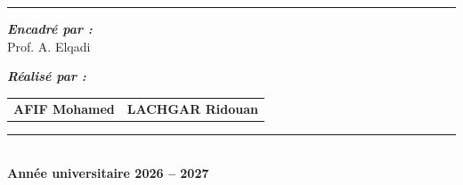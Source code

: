 \begin{titlepage}
\begin{center}
{\color{EnsamBlue}\rule{\textwidth}{2pt}}

\end{center}

\vspace{1.2cm}

\begin{center}

{\fontsize{12}{15}\selectfont
\bfseries\itshape\color{EnsamBlue}
Encadré par :}\\[0.4cm]

{\fontsize{13}{17}\selectfont
Prof. A. Elqadi}

\vspace{1.1cm}

{\fontsize{12}{15}\selectfont
\bfseries\itshape\color{EnsamBlue}
Réalisé par :}

\vspace{0.5cm}

\begin{tabular}{cc}
\fontsize{12}{16}\selectfont\bfseries AFIF Mohamed & \qquad\qquad\qquad
\fontsize{12}{16}\selectfont\bfseries LACHGAR Ridouan
\end{tabular}

\end{center}

\vfill

\begin{center}
    {\color{EnsamBlue}\rule{0.55\textwidth}{0.8pt}}\\[0.35cm]

    {\fontsize{12}{15}\selectfont
    \bfseries\color{gray}
    Année universitaire 2026 -- 2027}
\end{center}

\end{titlepage}
